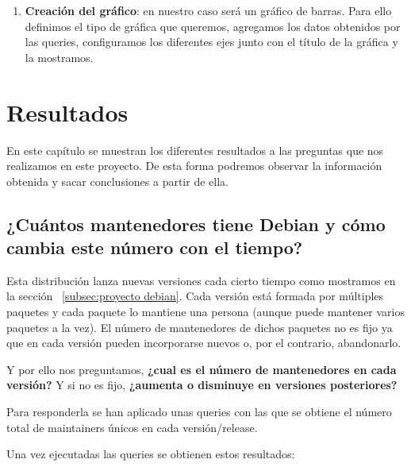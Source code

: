 \documentclass[a4paper, 12pt]{book}
\begin{document}
\begin{enumerate}
	
	\item \textbf{Creación del gráfico}: en nuestro caso será un gráfico de barras. Para ello definimos el tipo de gráfica que queremos, agregamos los datos obtenidos por las queries, configuramos los diferentes ejes junto con el título de la gráfica y la mostramos.
\end{enumerate}



\cleardoublepage
\chapter{Resultados}
\label{chap:resultados}

En este capítulo se muestran los diferentes resultados a las preguntas que nos realizamos en este proyecto. De esta forma podremos observar la información obtenida y sacar conclusiones a partir de ella.

\section{¿Cuántos mantenedores tiene Debian y cómo cambia este número con el tiempo?}
\label{sec:pregunta_1}
Esta distribución lanza nuevas versiones cada cierto tiempo como mostramos en la sección ~\ref{subsec:proyecto debian}. Cada versión está formada por múltiples paquetes y cada paquete lo mantiene una persona (aunque puede mantener varios paquetes a la vez). El número de mantenedores de dichos paquetes no es fijo ya que en cada versión pueden incorporarse nuevos o, por el contrario, abandonarlo.

Y por ello nos preguntamos,  \textbf{¿cual es el número de mantenedores en cada versión?} Y si no es fijo, \textbf{¿aumenta o disminuye en versiones posteriores?}

Para responderla se han aplicado unas queries con las que se obtiene el número total de maintainers únicos en cada versión/release.

Una vez ejecutadas las queries se obtienen estos resultados:
\end{document}
